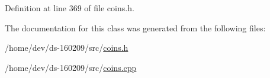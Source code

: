Definition at line 369 of file coins.\+h.



The documentation for this class was generated from the following files\+:\begin{DoxyCompactItemize}
\item 
/home/dev/ds-\/160209/src/\hyperlink{coins_8h}{coins.\+h}\item 
/home/dev/ds-\/160209/src/\hyperlink{coins_8cpp}{coins.\+cpp}\end{DoxyCompactItemize}
